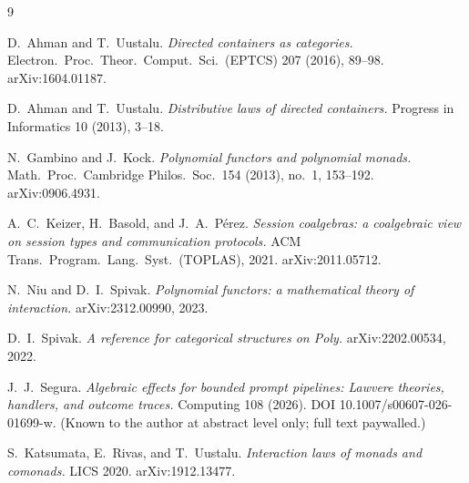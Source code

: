 \documentclass[11pt]{amsart}
\theoremstyle{plain}
\theoremstyle{definition}
\theoremstyle{remark}
\begin{document}
\begin{thebibliography}{9}

D.~Ahman and T.~Uustalu.
\emph{Directed containers as categories.}
Electron.\ Proc.\ Theor.\ Comput.\ Sci.\ (EPTCS) 207 (2016), 89--98. arXiv:1604.01187.

D.~Ahman and T.~Uustalu.
\emph{Distributive laws of directed containers.}
Progress in Informatics 10 (2013), 3--18.

N.~Gambino and J.~Kock.
\emph{Polynomial functors and polynomial monads.}
Math.\ Proc.\ Cambridge Philos.\ Soc.\ 154 (2013), no.~1, 153--192. arXiv:0906.4931.

A.~C.~Keizer, H.~Basold, and J.~A.~P\'erez.
\emph{Session coalgebras: a coalgebraic view on session types and communication protocols.}
ACM Trans.\ Program.\ Lang.\ Syst.\ (TOPLAS), 2021. arXiv:2011.05712.

N.~Niu and D.~I.~Spivak.
\emph{Polynomial functors: a mathematical theory of interaction.}
arXiv:2312.00990, 2023.

D.~I.~Spivak.
\emph{A reference for categorical structures on \textup{Poly}.}
arXiv:2202.00534, 2022.

J.~J.~Segura.
\emph{Algebraic effects for bounded prompt pipelines: Lawvere theories, handlers, and outcome
traces.}
Computing 108 (2026). DOI 10.1007/s00607-026-01699-w. \textup{(Known to the author at abstract level
only; full text paywalled.)}

S.~Katsumata, E.~Rivas, and T.~Uustalu.
\emph{Interaction laws of monads and comonads.}
LICS 2020. arXiv:1912.13477.

\end{thebibliography}
\end{document}
